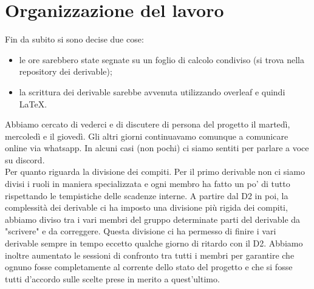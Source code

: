 \section{Organizzazione del lavoro}
Fin da subito si sono decise due cose:
\begin{itemize}
    \item le ore sarebbero state segnate su un foglio di calcolo condiviso (si trova nella repository dei derivable);
    \item la scrittura dei derivable sarebbe avvenuta utilizzando overleaf e quindi \LaTeX.
\end{itemize}
Abbiamo cercato di vederci e di discutere di persona del progetto il martedì, mercoledì e il giovedì. Gli altri giorni continuavamo comunque a comunicare online via whatsapp. In alcuni casi (non pochi) ci siamo sentiti per parlare a voce su discord. \\
Per quanto riguarda la divisione dei compiti. Per il primo derivable non ci siamo divisi i ruoli in maniera specializzata e ogni membro ha fatto un po' di tutto rispettando le tempistiche delle scadenze interne. A partire dal D2 in poi, la complessità dei derivable ci ha imposto una divisione più rigida dei compiti, abbiamo diviso tra i vari membri del gruppo determinate parti del derivable da "scrivere" e da correggere. Questa divisione ci ha permesso di finire i vari derivable sempre in tempo eccetto qualche giorno di ritardo con il D2. Abbiamo inoltre aumentato le sessioni di confronto tra tutti i membri per garantire che ognuno fosse completamente al corrente dello stato del progetto e che si fosse tutti d'accordo sulle scelte prese in merito a quest'ultimo. \\

